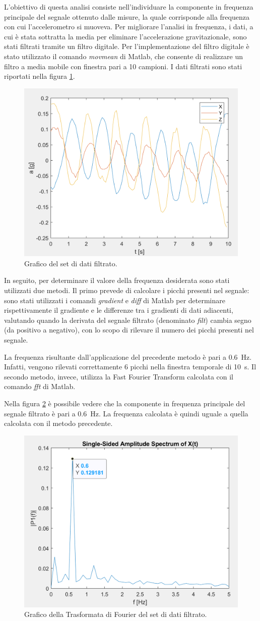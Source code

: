 L'obiettivo di questa analisi consiste nell'individuare la componente in frequenza principale del segnale ottenuto dalle misure, la quale corrisponde alla frequenza con cui l'accelerometro si muoveva. Per migliorare l'analisi in frequenza, i dati, a cui è stata sottratta la media per eliminare l'accelerazione gravitazionale, sono stati filtrati tramite un filtro digitale. Per l'implementazione del filtro digitale è stato utilizzato il comando \textit{movmean} di Matlab, che consente di realizzare un filtro a media mobile con finestra pari a 10 campioni. I dati filtrati sono stati riportati nella figura \ref{fig:plot_dati_filt}.
\begin{figure}[h]
	\centering		
	\includegraphics[width=0.6\linewidth]{./ImageFiles/plot1filt_arr2.png}
	\caption{Grafico del set di dati filtrato.}
	\label{fig:plot_dati_filt}
\end{figure}
\newpage
In seguito, per determinare il valore della frequenza desiderata sono stati utilizzati due metodi. Il primo prevede di calcolare i picchi presenti nel segnale: sono stati utilizzati i comandi \textit{gradient} e \textit{diff} di Matlab per determinare rispettivamente il gradiente e le differenze tra i gradienti di dati adiacenti, valutando quando la derivata del segnale filtrato (denominato \textit{filt}) cambia segno (da positivo a negativo), con lo scopo di rilevare il numero dei picchi presenti nel segnale.

La frequenza risultante dall'applicazione del precedente metodo è pari a \SI{0.6}{\hertz}. Infatti, vengono rilevati correttamente 6 picchi nella finestra temporale di \SI{10}{\second}.
Il secondo metodo, invece, utilizza la Fast Fourier Transform calcolata con il comando \textit{fft} di Matlab.

Nella figura \ref{fig:plot_fft} è possibile vedere che la componente in frequenza principale del segnale filtrato è pari a \SI{0.6}{\hertz}. La frequenza calcolata è quindi uguale a quella calcolata con il metodo precedente.
\begin{figure}[tbh]
	\centering		
	\includegraphics[width=0.6\linewidth]{./ImageFiles/plot2_arr2.png}
	\caption{Grafico della Trasformata di Fourier del set di dati filtrato.}
	\label{fig:plot_fft}
\end{figure}